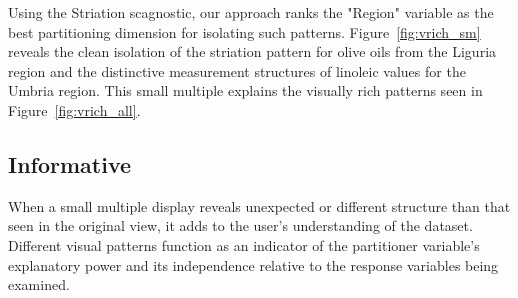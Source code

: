 Using the Striation scagnostic, our approach ranks the "Region" variable as the best partitioning dimension for isolating such patterns. Figure~\ref{fig:vrich_sm} reveals the clean isolation of the striation pattern for olive oils from the Liguria region and the distinctive measurement structures of linoleic values for the Umbria region. This small multiple explains the visually rich patterns seen in Figure~\ref{fig:vrich_all}.

\subsection{Informative}

When a small multiple display reveals unexpected or different structure than that seen in the original view, it adds to the user's understanding of the dataset. Different visual patterns function as an indicator of the partitioner variable's explanatory power and its independence relative to the response variables being examined.

